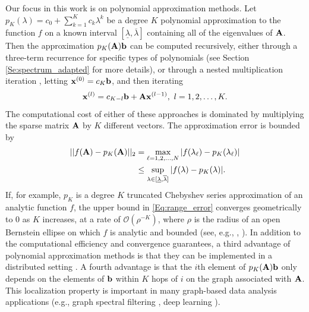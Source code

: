\documentclass{article}
\begin{document}
Our focus in this work is on polynomial approximation methods. Let $p_K(\lambda)=c_0+\sum_{k=1}^K c_k \lambda^k$ be a degree $K$ polynomial approximation to the function $f$ on a known interval $[\underline{\lambda},\overline{\lambda}]$ containing all of the eigenvalues of ${\bf A}$. Then the approximation $p_K({\bf A}){\bf b}$ can be computed recursively, either through a three-term recurrence for specific types of polynomials (see Section \ref{Se:spectrum_adapted} for more details), or 
through a nested multiplication iteration \cite[Section 9.2.4]{golub}, letting ${\bf x}^{(0)} = c_K {\bf b}$, and then iterating
\begin{align*}%
{\bf x}^{(l)}=c_{K-l}{\bf b} + {\bf A}{\bf x}^{(l-1)},~l=1,2,\ldots,K.
\end{align*}
The computational cost of either of these approaches is dominated by multiplying the sparse matrix ${\bf A}$ by $K$ different vectors. The approximation error is bounded by 
\begin{align}
||f({\bf A})-p_K({\bf A})||_2&=\max_{\ell=1,2,\ldots,N}|f(\lambda_{\ell})-p_K(\lambda_{\ell})| \label{Eq:exact_error} \\ 
&\leq \sup_{\lambda \in [\underline{\lambda},\overline{\lambda}]}|f(\lambda)-p_K(\lambda)|. \label{Eq:range_error}
\end{align}
If, for example, $p_K$ is a degree $K$ truncated Chebyshev series approximation of an analytic function $f$, the upper bound in \eqref{Eq:range_error} converges geometrically to 0 as $K$ increases, at a rate of ${\mathcal{O}}\left({\rho^{-K}}\right)$, where $\rho$ is the radius of an open Bernstein ellipse on which $f$ is analytic and bounded (see, e.g., \cite[Theorem 5.16]{handscomb}, \cite[Theorem 8.2]{atap}).
In addition to the computational efficiency and convergence guarantees, a third advantage of polynomial approximation methods is that they can be implemented in a distributed setting \cite{shuman_distributed_SIPN_2018}. A fourth advantage is that the $i$th element of $p_K({\bf A}){\bf b}$ only depends on the elements of ${\bf b}$ within $K$ hops of $i$ on the graph associated with ${\bf A}$. This localization property is important in many graph-based data analysis applications (e.g., graph spectral filtering \cite{LTS-ARTICLE-2009-053}, deep learning \cite{defferrard2016convolutional}).
\end{document}
